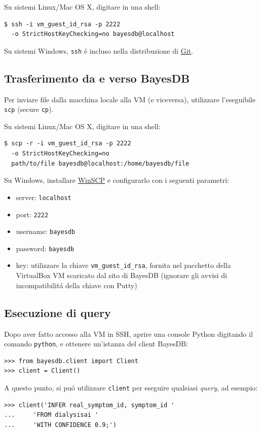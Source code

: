 \documentclass[preprint]{acm_proc_article-sp}
\begin{document}
Su sistemi Linux/Mac OS X, digitare in una shell:
\begin{verbatim}
$ ssh -i vm_guest_id_rsa -p 2222 
  -o StrictHostKeyChecking=no bayesdb@localhost
\end{verbatim}

Su sistemi Windows, \verb|ssh| \'e incluso nella distribuzione di \href{http://git-scm.com/}{Git}.

\subsection{Trasferimento da e verso BayesDB}
\label{appendix-bayesdb-trasferimento}
Per inviare file dalla macchina locale alla VM (e viceversa), utilizzare l'eseguibile \verb|scp| (secure \verb|cp|).

Su sistemi Linux/Mac OS X, digitare in una shell:
\begin{verbatim}
$ scp -r -i vm_guest_id_rsa -p 2222 
  -o StrictHostKeyChecking=no 
  path/to/file bayesdb@localhost:/home/bayesdb/file
\end{verbatim}

Su Windows, installare \href{http://winscp.net/eng/index.php}{WinSCP} e configurarlo con i seguenti parametri:
\begin{itemize}
\item server: \verb|localhost|
\item port: \verb|2222|
\item username: \verb|bayesdb|
\item password: \verb|bayesdb|
\item key: utilizzare la chiave \verb|vm_guest_id_rsa|, fornita nel pacchetto della VirtualBox VM scaricato dal sito di BayesDB (ignorare gli avvisi di incompatibilit\'a della chiave con Putty)
\end{itemize}

\subsection{Esecuzione di query}
\label{appendix-bayesdb-query}
Dopo aver fatto accesso alla VM in SSH, aprire una console Python digitando il comando \verb|python|, e ottenere un'istanza del client BayesDB:
\begin{verbatim}
>>> from bayesdb.client import Client
>>> client = Client()
\end{verbatim}
A questo punto, si pu\'o utilizzare \verb|client| per eseguire qualsiasi \textit{query}, ad esempio:
\begin{verbatim}
>>> client('INFER real_symptom_id, symptom_id '
...     'FROM dialysisai '
...     'WITH CONFIDENCE 0.9;')
\end{verbatim}

\balancecolumns

\end{document}
